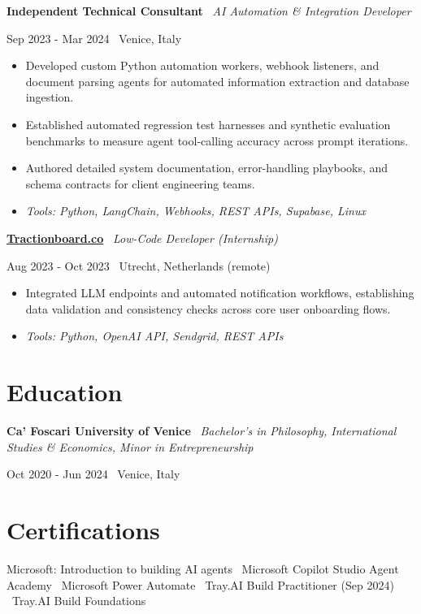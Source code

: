 \documentclass[a4paper,10pt]{article}
\newcommand{\role}[4]{%
 \vspace{2pt}\noindent
 \begin{minipage}[t]{0.70\textwidth}\raggedright\textbf{#1} \textbullet\ \textit{#3}\end{minipage}%
 \hfill
 \begin{minipage}[t]{0.28\textwidth}\raggedleft\footnotesize\color{gray}#2 \textbullet\ #4\end{minipage}%
 \vspace{1pt}%
}
\begin{document}
\role{Independent Technical Consultant}{Sep 2023 - Mar 2024}{AI Automation \& Integration Developer}{Venice, Italy}
\begin{itemize}
 \item Developed custom Python automation workers, webhook listeners, and document parsing agents for automated information extraction and database ingestion.
 \item Established automated regression test harnesses and synthetic evaluation benchmarks to measure agent tool-calling accuracy across prompt iterations.
 \item Authored detailed system documentation, error-handling playbooks, and schema contracts for client engineering teams.
 \item \textit{Tools: Python, LangChain, Webhooks, REST APIs, Supabase, Linux}
\end{itemize}

\role{\href{https://tractionboard.co}{Tractionboard.co}}{Aug 2023 - Oct 2023}{Low-Code Developer (Internship)}{Utrecht, Netherlands (remote)}
\begin{itemize}
 \item Integrated LLM endpoints and automated notification workflows, establishing data validation and consistency checks across core user onboarding flows.
 \item \textit{Tools: Python, OpenAI API, Sendgrid, REST APIs}
\end{itemize}

\section{Education}
\role{Ca' Foscari University of Venice}{Oct 2020 - Jun 2024}{Bachelor's in Philosophy, International Studies \& Economics, Minor in Entrepreneurship}{Venice, Italy}

\section{Certifications}
Microsoft: Introduction to building AI agents \textbullet\ Microsoft Copilot Studio Agent Academy \textbullet\ Microsoft Power Automate \textbullet\ Tray.AI Build Practitioner (Sep 2024) \textbullet\ Tray.AI Build Foundations

\end{document}
